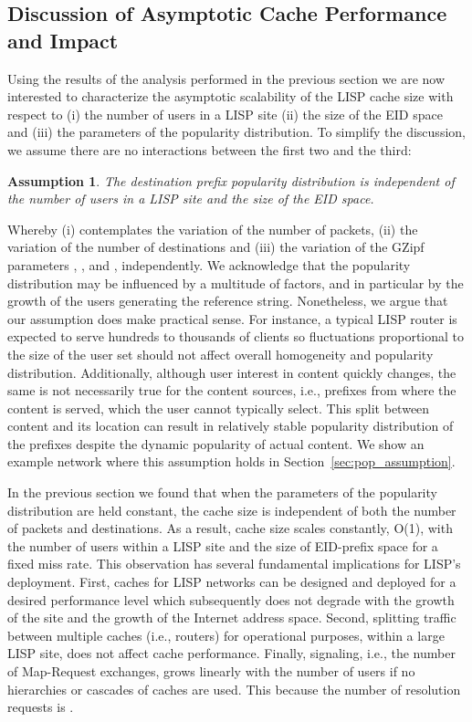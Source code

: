 \documentclass[twocolumn, 10pt]{article}
\theoremstyle{plain}
\newtheorem{assumption}{Assumption}
\begin{document}
\subsection{Discussion of Asymptotic Cache Performance and Impact}

Using the results of the analysis performed in the previous section we are now
interested to characterize the asymptotic scalability of the LISP cache size
with respect to (i) the number of users in a LISP site (ii) the size of the
EID space and (iii) the parameters of the popularity distribution. To simplify
the discussion, we assume there are no interactions between the first two and
the third:

\begin{assumption}
    The destination prefix popularity distribution is independent of the
    number of users in a LISP site and the size of the EID space.
\end{assumption}

Whereby (i) contemplates the variation of the number of packets,  (ii) the
variation of the number of destinations  and (iii) the variation of the
GZipf parameters , ,  and , independently. We acknowledge that the
popularity distribution may be influenced by a multitude of factors, and in
particular by the growth of the users generating the reference string.
Nonetheless, we argue that our assumption does make practical sense.  For
instance, a typical LISP router is expected to serve hundreds to thousands of
clients so fluctuations proportional to the size of the user set should
not affect overall homogeneity and popularity distribution.  Additionally,
although user interest in content quickly changes, the same is not necessarily
true for the content sources, i.e., prefixes from where the content is
served, which the user cannot typically select. This split between content and its
location can result in relatively stable popularity distribution of the 
prefixes despite the dynamic popularity of actual content. We show an example
network where this assumption holds in Section~\ref{sec:pop_assumption}.  


In the previous section we found that when the parameters of the popularity
distribution are held constant, the cache size is independent of both the
number of packets and destinations. As a result, cache size scales constantly,
O(1), with the number of users within a LISP site and the size of EID-prefix space
for a fixed miss rate. This observation has several fundamental implications
for LISP's deployment. First, caches for LISP networks can be designed and
deployed for a desired performance level which subsequently does not degrade
with the growth of the site and the growth of the Internet address space.
Second, splitting traffic between multiple caches (i.e., routers) for
operational purposes, within a large LISP site, does not affect cache
performance.  Finally, signaling, i.e., the number of Map-Request exchanges,
grows linearly with the number of users if no hierarchies or cascades of
caches are used. This because the number of resolution requests is .
\end{document}

